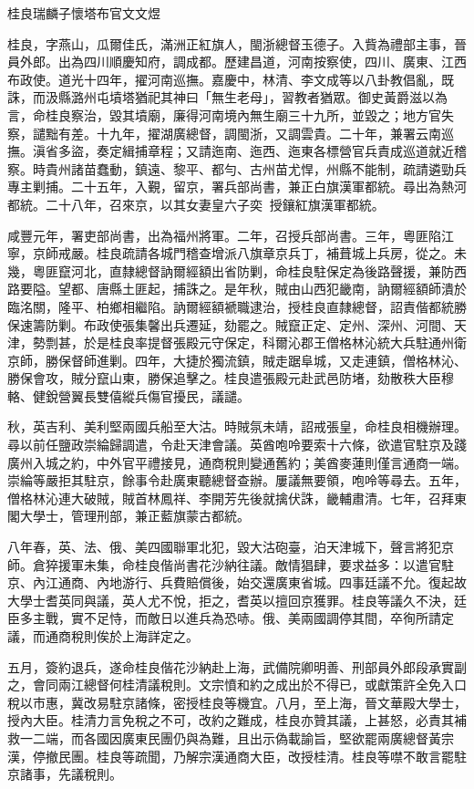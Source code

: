 
\begin{pinyinscope}
桂良瑞麟子懷塔布官文文煜

桂良，字燕山，瓜爾佳氏，滿洲正紅旗人，閩浙總督玉德子。入貲為禮部主事，晉員外郎。出為四川順慶知府，調成都。歷建昌道，河南按察使，四川、廣東、江西布政使。道光十四年，擢河南巡撫。嘉慶中，林清、李文成等以八卦教倡亂，既誅，而汲縣潞州屯墳塔猶祀其神曰「無生老母」，習教者猶眾。御史黃爵滋以為言，命桂良察治，毀其墳廟，廉得河南境內無生廟三十九所，並毀之；地方官失察，譴黜有差。十九年，擢湖廣總督，調閩浙，又調雲貴。二十年，兼署云南巡撫。滇省多盜，奏定緝捕章程；又請迤南、迤西、迤東各標營官兵責成巡道就近稽察。時貴州諸苗蠢動，鎮遠、黎平、都勻、古州苗尤悍，州縣不能制，疏請遴勁兵專主剿捕。二十五年，入覲，留京，署兵部尚書，兼正白旗漢軍都統。尋出為熱河都統。二十八年，召來京，以其女妻皇六子奕，授鑲紅旗漢軍都統。

咸豐元年，署吏部尚書，出為福州將軍。二年，召授兵部尚書。三年，粵匪陷江寧，京師戒嚴。桂良疏請各城門稽查增派八旗章京兵丁，補葺城上兵房，從之。未幾，粵匪竄河北，直隸總督訥爾經額出省防剿，命桂良駐保定為後路聲援，兼防西路要隘。望都、唐縣土匪起，捕誅之。是年秋，賊由山西犯畿南，訥爾經額師潰於臨洺關，隆平、柏鄉相繼陷。訥爾經額褫職逮治，授桂良直隸總督，詔責偕都統勝保速籌防剿。布政使張集馨出兵遷延，劾罷之。賊竄正定、定州、深州、河間、天津，勢剽甚，於是桂良率提督張殿元守保定，科爾沁郡王僧格林沁統大兵駐通州衛京師，勝保督師進剿。四年，大捷於獨流鎮，賊走踞阜城，又走連鎮，僧格林沁、勝保會攻，賊分竄山東，勝保追擊之。桂良遣張殿元赴武邑防堵，劾散秩大臣穆輅、健銳營翼長雙僖縱兵傷官擾民，議譴。

秋，英吉利、美利堅兩國兵船至大沽。時賊氛未靖，詔戒張皇，命桂良相機辦理。尋以前任鹽政崇綸歸調遣，令赴天津會議。英酋咆呤要索十六條，欲遣官駐京及踐廣州入城之約，中外官平禮接見，通商稅則變通舊約；美酋麥蓮則僅言通商一端。崇綸等嚴拒其駐京，餘事令赴廣東聽總督查辦。屢議無要領，咆呤等尋去。五年，僧格林沁連大破賊，賊首林鳳祥、李開芳先後就擒伏誅，畿輔肅清。七年，召拜東閣大學士，管理刑部，兼正藍旗蒙古都統。

八年春，英、法、俄、美四國聯軍北犯，毀大沽砲臺，泊天津城下，聲言將犯京師。倉猝援軍未集，命桂良偕尚書花沙納往議。敵情猖肆，要求益多：以遣官駐京、內江通商、內地游行、兵費賠償後，始交還廣東省城。四事廷議不允。復起故大學士耆英同與議，英人尤不悅，拒之，耆英以擅回京獲罪。桂良等議久不決，廷臣多主戰，實不足恃，而敵日以進兵為恐哧。俄、美兩國調停其間，卒徇所請定議，而通商稅則俟於上海詳定之。

五月，簽約退兵，遂命桂良偕花沙納赴上海，武備院卿明善、刑部員外郎段承實副之，會同兩江總督何桂清議稅則。文宗憤和約之成出於不得已，或獻策許全免入口稅以市惠，冀改易駐京諸條，密授桂良等機宜。八月，至上海，晉文華殿大學士，授內大臣。桂清力言免稅之不可，改約之難成，桂良亦贊其議，上甚怒，必責其補救一二端，而各國因廣東民團仍與為難，且出示偽載諭旨，堅欲罷兩廣總督黃宗漢，停撤民團。桂良等疏聞，乃解宗漢通商大臣，改授桂清。桂良等噤不敢言罷駐京諸事，先議稅則。


\end{pinyinscope}
